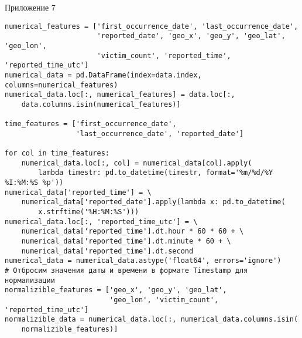 \newpage
{}
Приложение 7
\begin{code}
\begin{verbatim}
numerical_features = ['first_occurrence_date', 'last_occurrence_date',
                      'reported_date', 'geo_x', 'geo_y', 'geo_lat', 'geo_lon',
                      'victim_count', 'reported_time', 'reported_time_utc']
numerical_data = pd.DataFrame(index=data.index, columns=numerical_features)
numerical_data.loc[:, numerical_features] = data.loc[:,
    data.columns.isin(numerical_features)]

time_features = ['first_occurrence_date',
                 'last_occurrence_date', 'reported_date']

for col in time_features:
    numerical_data.loc[:, col] = numerical_data[col].apply(
        lambda timestr: pd.to_datetime(timestr, format='%m/%d/%Y %I:%M:%S %p'))
numerical_data['reported_time'] = \
    numerical_data['reported_date'].apply(lambda x: pd.to_datetime(
        x.strftime('%H:%M:%S')))
numerical_data.loc[:, 'reported_time_utc'] = \
    numerical_data['reported_time'].dt.hour * 60 * 60 + \
    numerical_data['reported_time'].dt.minute * 60 + \
    numerical_data['reported_time'].dt.second
numerical_data = numerical_data.astype('float64', errors='ignore')
# Отбросим значения даты и времени в формате Timestamp для нормализации
normalizible_features = ['geo_x', 'geo_y', 'geo_lat',
                         'geo_lon', 'victim_count', 'reported_time_utc']
normalizible_data = numerical_data.loc[:, numerical_data.columns.isin(
    normalizible_features)]
\end{verbatim}
\end{code}
\label{appendix:7}

